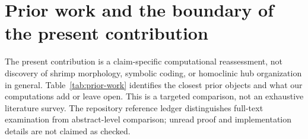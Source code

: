 \section{Prior work and the boundary of the present contribution}
\label{supp:prior-work}

The present contribution is a claim-specific computational reassessment,
not discovery of shrimp morphology, symbolic coding, or homoclinic hub
organization in general. Table~\ref{tab:prior-work} identifies the closest
prior objects and what our computations add or leave open. This is a targeted
comparison, not an exhaustive literature survey. The repository reference
ledger distinguishes full-text examination from abstract-level comparison;
unread proof and implementation details are not claimed as checked.

\small
\renewcommand{\arraystretch}{1.15}
